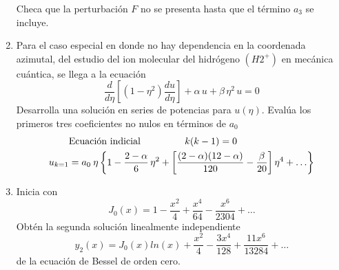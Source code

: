 \begin{enumerate}
Checa que la perturbación $F$ no se presenta hasta que el término $a_{3}$ se incluye.
\item Para el caso especial en donde no hay dependencia en la coordenada azimutal, del estudio del ion molecular del hidrógeno $(H2^{+})$ en mecánica cuántica, se llega a la ecuación
\[ \dfrac{d}{d \eta} \left[ (1 - \eta^{2} ) \dfrac{d u}{d \eta} \right] + \alpha \, u + \beta \, \eta^{2} \, u = 0 \]
Desarrolla una solución en series de potencias para $u(\eta)$. Evalúa los primeros tres coeficientes no nulos en términos de $a_{0}$
\[  \begin{split}
& \text{Ecuación indicial } \hspace{1.5cm} k(k-1) = 0 \\
u_{k=1} &=  a_{0} \: \eta \left\lbrace 1 - \dfrac{2- \alpha}{6} \, \eta^{2} + \left[ \dfrac{(2-\alpha)(12-\alpha)}{120} - \dfrac{\beta}{20} \right] \eta^{4} + \ldots \right\rbrace
\end{split} \] 

\item Inicia con 
\[ J_{0} (x) = 1 - \dfrac{x^{2}}{4} +  \dfrac{x^{4}}{64} -  \dfrac{x^{6}}{2304} + \ldots \]
Obtén la segunda solución linealmente independiente
\[ y_{2}(x) = J_{0}(x) ln(x) + \dfrac{x^{2}}{4} -  \dfrac{3 x^{4}}{128} +  \dfrac{11 x^{6}}{13284}+ \ldots \]
de la ecuación de Bessel de orden cero.
\end{enumerate}

